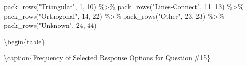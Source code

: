 \documentclass[
  letterpaper,
  DIV=11,
  numbers=noendperiod]{scrreprt}
\newenvironment{Shaded}{\begin{snugshade}}{\end{snugshade}}
\newcommand{\DecValTok}[1]{\textcolor[rgb]{0.68,0.00,0.00}{#1}}
\newcommand{\FunctionTok}[1]{\textcolor[rgb]{0.28,0.35,0.67}{#1}}
\newcommand{\NormalTok}[1]{\textcolor[rgb]{0.00,0.23,0.31}{#1}}
\newcommand{\SpecialCharTok}[1]{\textcolor[rgb]{0.37,0.37,0.37}{#1}}
\newcommand{\StringTok}[1]{\textcolor[rgb]{0.13,0.47,0.30}{#1}}
\begin{document}
\begin{Shaded}
\begin{Highlighting}[]
  \FunctionTok{pack\_rows}\NormalTok{(}\StringTok{"Triangular"}\NormalTok{, }\DecValTok{1}\NormalTok{, }\DecValTok{10}\NormalTok{) }\SpecialCharTok{\%\textgreater{}\%}
  \FunctionTok{pack\_rows}\NormalTok{(}\StringTok{"Lines{-}Connect"}\NormalTok{, }\DecValTok{11}\NormalTok{, }\DecValTok{13}\NormalTok{) }\SpecialCharTok{\%\textgreater{}\%}
  \FunctionTok{pack\_rows}\NormalTok{(}\StringTok{"Orthogonal"}\NormalTok{, }\DecValTok{14}\NormalTok{, }\DecValTok{22}\NormalTok{) }\SpecialCharTok{\%\textgreater{}\%}
  \FunctionTok{pack\_rows}\NormalTok{(}\StringTok{"Other"}\NormalTok{, }\DecValTok{23}\NormalTok{, }\DecValTok{23}\NormalTok{) }\SpecialCharTok{\%\textgreater{}\%}
  \FunctionTok{pack\_rows}\NormalTok{(}\StringTok{"Unknown"}\NormalTok{, }\DecValTok{24}\NormalTok{, }\DecValTok{44}\NormalTok{)}
\end{Highlighting}
\end{Shaded}

\textbackslash begin\{table\}

\textbackslash caption\{\label{tab:Q15-RESPONSES}Frequency of Selected
Response Options for Question \#15\} \centering
\end{document}

